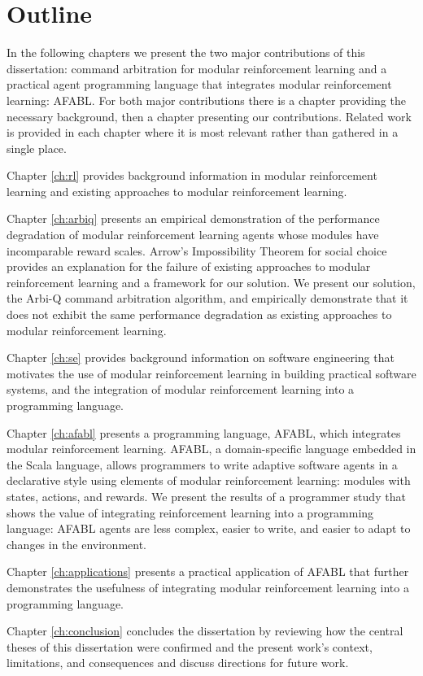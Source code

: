 \section{Outline}

In the following chapters we present the two major contributions of this dissertation: command arbitration for modular reinforcement learning and a practical agent programming language that integrates modular reinforcement learning: AFABL. For both major contributions there is a chapter providing the necessary background, then a chapter presenting our contributions. Related work is provided in each chapter where it is most relevant rather than gathered in a single place.

Chapter \ref{ch:rl} provides background information in modular reinforcement learning and existing approaches to modular reinforcement learning.

Chapter \ref{ch:arbiq} presents an empirical demonstration of the performance degradation of modular reinforcement learning agents whose modules have incomparable reward scales. Arrow's Impossibility Theorem for social choice provides an explanation for the failure of existing approaches to modular reinforcement learning and a framework for our solution. We present our solution, the Arbi-Q command arbitration algorithm, and empirically demonstrate that it does not exhibit the same performance degradation as existing approaches to modular reinforcement learning.

Chapter \ref{ch:se} provides background information on software engineering that motivates the use of modular reinforcement learning in building practical software systems, and the integration of modular reinforcement learning into a programming language.

Chapter \ref{ch:afabl} presents a programming language, AFABL, which integrates modular reinforcement learning. AFABL, a domain-specific language embedded in the Scala language, allows programmers to write adaptive software agents in a declarative style using elements of modular reinforcement learning: modules with states, actions, and rewards. We present the results of a programmer study that shows the value of integrating reinforcement learning into a programming language: AFABL agents are less complex, easier to write, and easier to adapt to changes in the environment.

Chapter \ref{ch:applications} presents a practical application of AFABL that further demonstrates the usefulness of integrating modular reinforcement learning into a programming language.

Chapter \ref{ch:conclusion} concludes the dissertation by reviewing how the central theses of this dissertation were confirmed and the present work's context, limitations, and consequences and discuss directions for future work.
